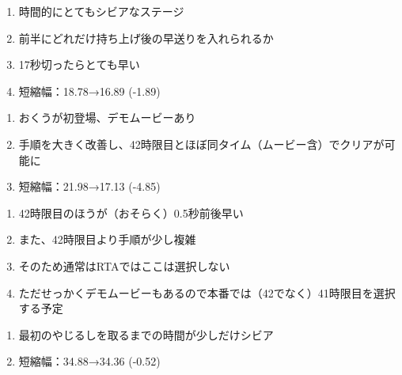 \clearpage
\begin{enumerate}[label={\sarrow}]
\item 時間的にとてもシビアなステージ
\item 前半にどれだけ持ち上げ後の早送りを入れられるか
\item 17秒切ったらとても早い
\item 短縮幅：18.78→16.89 (-1.89)
\end{enumerate}



\begin{enumerate}[label={\sarrow}]
\item おくうが初登場、デモムービーあり
\item 手順を大きく改善し、42時限目とほぼ同タイム（ムービー含）でクリアが可能に
\item 短縮幅：21.98→17.13 (-4.85)
\end{enumerate}
\begin{marker}
\begin{enumerate}[label={\sarrow}]
\item 42時限目のほうが（おそらく）0.5秒前後早い
\item また、42時限目より手順が少し複雑
\item そのため通常はRTAではここは選択しない
\item ただせっかくデモムービーもあるので本番では（42でなく）41時限目を選択する予定
\end{enumerate}
\end{marker}


\begin{enumerate}[label={\sarrow}]
\item 最初のやじるしを取るまでの時間が少しだけシビア
\item 短縮幅：34.88→34.36 (-0.52)
\end{enumerate}




